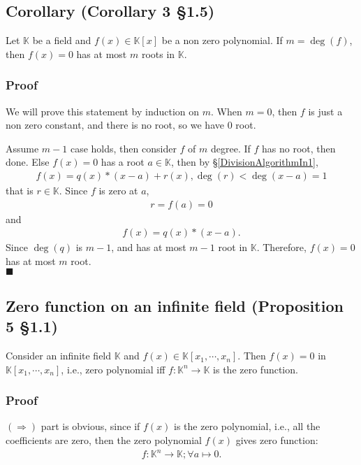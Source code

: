 \documentclass[11pt]{book}
\begin{document}
\subsection{Corollary (Corollary 3 \S1.5)}
\label{atMostDeg}
Let $\mathbb{K}$ be a field and $f(x) \in \mathbb{K}[x]$ be a non zero polynomial.
If $m = \deg(f)$, then $f(x) = 0$ has at most $m$ roots in $\mathbb{K}$.

\subsubsection{Proof}
We will prove this statement by induction on $m$.
When $m=0$, then $f$ is just a non zero constant, and there is no root, so we have $0$ root.

Assume $m-1$ case holds, then consider $f$ of $m$ degree.
If $f$ has no root, then done.
Else $f(x)=0$ has a root $a \in \mathbb{K}$, then by \S\ref{DivisionAlgorithmIn1},
\begin{eqnarray}
f(x) = q(x)* (x-a) + r(x), \deg(r) < \deg(x-a)=1
\end{eqnarray}
that is $r \in \mathbb{K}$.
Since $f$ is zero at $a$,
\begin{eqnarray}
r = f(a) = 0
\end{eqnarray}
and
\begin{eqnarray}
f (x)= q(x)* (x-a).
\end{eqnarray}
Since $\deg(q)$ is $m-1$, and has at most $m-1$ root in $\mathbb{K}$.
Therefore, $f(x)=0$ has at most $m$ root.\\
$\blacksquare$

\subsection{Zero function on an infinite field (Proposition 5 \S1.1)}
\label{zeroPolZeroFunc}
Consider an infinite field $\mathbb{K}$ and $f(x) \in \mathbb{K}[x_1, \cdots, x_n]$.
Then $f(x) = 0$ in $\mathbb{K}[x_1, \cdots, x_n]$, i.e., zero polynomial iff $f : \mathbb{K}^n \to \mathbb{K}$ is the zero function.

\subsubsection{Proof}
$(\Rightarrow)$ part is obvious, since if $f(x)$ is the zero polynomial, i.e., all the coefficients are zero, then the zero polynomial $f(x)$ gives zero function:
\begin{eqnarray}
f : \mathbb{K}^n \to \mathbb{K}; \forall a \mapsto 0.
\end{eqnarray}
\end{document}
